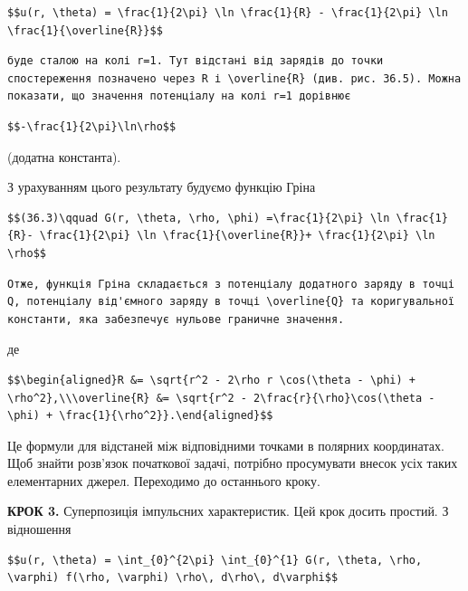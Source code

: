 \documentclass[
  ukrainian,
]{article}
\begin{document}
\begin{verbatim}
$$u(r, \theta) = \frac{1}{2\pi} \ln \frac{1}{R} - \frac{1}{2\pi} \ln \frac{1}{\overline{R}}$$
\end{verbatim}

\begin{verbatim}
буде сталою на колі r=1. Тут відстані від зарядів до точки спостереження позначено через R і \overline{R} (див. рис. 36.5). Можна показати, що значення потенціалу на колі r=1 дорівнює
\end{verbatim}

\begin{verbatim}
$$-\frac{1}{2\pi}\ln\rho$$
\end{verbatim}

(додатна константа).

З урахуванням цього результату будуємо функцію Гріна

\begin{verbatim}
$$(36.3)\qquad G(r, \theta, \rho, \phi) =\frac{1}{2\pi} \ln \frac{1}{R}- \frac{1}{2\pi} \ln \frac{1}{\overline{R}}+ \frac{1}{2\pi} \ln \rho$$
\end{verbatim}

\begin{verbatim}
Отже, функція Гріна складається з потенціалу додатного заряду в точці Q, потенціалу від'ємного заряду в точці \overline{Q} та коригувальної константи, яка забезпечує нульове граничне значення.
\end{verbatim}

де

\begin{verbatim}
$$\begin{aligned}R &= \sqrt{r^2 - 2\rho r \cos(\theta - \phi) + \rho^2},\\\overline{R} &= \sqrt{r^2 - 2\frac{r}{\rho}\cos(\theta - \phi) + \frac{1}{\rho^2}}.\end{aligned}$$
\end{verbatim}

Це формули для відстаней між відповідними точками в полярних
координатах. Щоб знайти розв'язок початкової задачі, потрібно
просумувати внесок усіх таких елементарних джерел. Переходимо до
останнього кроку.

\textbf{КРОК 3.} Суперпозиція імпульсних характеристик. Цей крок досить
простий. З відношення

\begin{verbatim}
$$u(r, \theta) = \int_{0}^{2\pi} \int_{0}^{1} G(r, \theta, \rho, \varphi) f(\rho, \varphi) \rho\, d\rho\, d\varphi$$
\end{verbatim}
\end{document}
